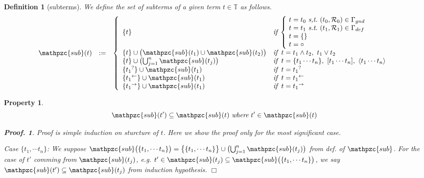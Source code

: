 \documentclass[12pt]{article}
\newtheorem{Definition}{Definition}[section]
\newtheorem{Property}{Property}[section]
\newtheorem{Proof}{Proof.}
\begin{document}
\begin{Definition}[subterms]
  We define the set of subterms of a given term $t \in \mathbb{T}$ as
  follows.
  \begin{displaymath}
    \begin{array}{lll}
      \mathpzc{sub}(t) &:=
      & \left\{ \begin{array}{ll}
          \{t \}  &
           \text{\it if}\;
            \left\{ \! \begin{array}{l}
              t = t_0\ \text{\it s,t.}\
               (t_0, \mathcal{R}_0) \in \Gamma_{gnd}  \\
              t = t_1\ \text{\it s.t.}\
               (t_1, \mathcal{R}_1) \in \Gamma_{def}  \\
              t = \{\}  \\
              t = \circ
            \end{array} \right.  \\
          \{t \} \cup \bigl(\mathpzc{sub}(t_1) \cup \mathpzc{sub}(t_2)
           \bigr)  &
           \text{\it if}\;\; t = t_1 \wedge t_2,\ t_1 \vee t_2  \\
          \{t \} \cup \bigl(\bigcup^{n}_{j=1} \mathpzc{sub}(t_j) \bigr)  &
           \text{\it if}\;\; t = \{t_1 \cdots t_n \},
            \ [t_1 \cdots t_n ], \ \langle t_1 \cdots t_n \rangle  \\
          \{{t_1}^? \} \cup \mathpzc{sub}(t_1)  &
           \text{\it if}\;\; t = {t_1}^?  \\
          \{{t_1}^\leftarrow \} \cup \mathpzc{sub}(t_1)  &
           \text{\it if}\;\; t = {t_1}^\leftarrow \\
          \{{t_1}^\rightarrow \} \cup \mathpzc{sub}(t_1)  &
           \text{\it if}\;\; t = {t_1}^\rightarrow
        \end{array} \right.
    \end{array}
  \end{displaymath}
\end{Definition}


\begin{Property}
  \label{self_similarity_on_subterms}
  \[ \mathpzc{sub}(t') \subseteq \mathpzc{sub}(t)\ \text{\it where}\
      t' \in \mathpzc{sub}(t)
  \]
  \begin{Proof}
    Proof is simple induction on sturcture of $t$.
    Here we show the proof only for the most significant case.
    
    Case $\{t_1, \cdots t_n\}$:
    We suppose $\mathpzc{sub}\bigl(\{t_1, \cdots t_n\} \bigr) =
    \bigl\{\{t_1, \cdots t_n\} \bigr\} \cup
    \bigl(\bigcup_{j=1}^n \mathpzc{sub}(t_j) \bigr)$ from def. of
    $\mathpzc{sub}$. For the case of $t'$ comming from
    $\mathpzc{sub}(t_j)$, e.g. $t' \in \mathpzc{sub}(t_j) \subseteq
    \mathpzc{sub}\bigl(\{t_1, \cdots t_n\} \bigr)$, we say
    $\mathpzc{sub}(t') \subseteq \mathpzc{sub}(t_j)$ from
    induction hypothesis.
    $\Box$
  \end{Proof}
\end{Property}
\end{document}
